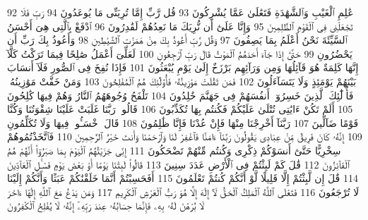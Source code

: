 {\tiny\colorbox{cl_aya}{92}} عَٰلِمِ ٱلْغَيْبِ وَٱلشَّهَٰدَةِ فَتَعَٰلَىٰ عَمَّا يُشْرِكُونَ
{\tiny\colorbox{cl_aya}{93}} قُل رَّبِّ إِمَّا تُرِيَنِّى مَا يُوعَدُونَ
{\tiny\colorbox{cl_aya}{94}} رَبِّ فَلَا تَجْعَلْنِى فِى ٱلْقَوْمِ ٱلظَّٰلِمِينَ
{\tiny\colorbox{cl_aya}{95}} وَإِنَّا عَلَىٰٓ أَن نُّرِيَكَ مَا نَعِدُهُمْ لَقَٰدِرُونَ
{\tiny\colorbox{cl_aya}{96}} ٱدْفَعْ بِٱلَّتِى هِىَ أَحْسَنُ ٱلسَّيِّئَةَ نَحْنُ أَعْلَمُ بِمَا يَصِفُونَ
{\tiny\colorbox{cl_aya}{97}} وَقُل رَّبِّ أَعُوذُ بِكَ مِنْ هَمَزَٰتِ ٱلشَّيَٰطِينِ
{\tiny\colorbox{cl_aya}{98}} وَأَعُوذُ بِكَ رَبِّ أَن يَحْضُرُونِ
{\tiny\colorbox{cl_aya}{99}} حَتَّىٰٓ إِذَا جَآءَ أَحَدَهُمُ ٱلْمَوْتُ قَالَ رَبِّ ٱرْجِعُونِ
{\tiny\colorbox{cl_aya}{100}} لَعَلِّىٓ أَعْمَلُ صَٰلِحًا فِيمَا تَرَكْتُ كَلَّآ إِنَّهَا كَلِمَةٌ هُوَ قَآئِلُهَا وَمِن وَرَآئِهِم بَرْزَخٌ إِلَىٰ يَوْمِ يُبْعَثُونَ
{\tiny\colorbox{cl_aya}{101}} فَإِذَا نُفِخَ فِى ٱلصُّورِ فَلَآ أَنسَابَ بَيْنَهُمْ يَوْمَئِذٍ وَلَا يَتَسَآءَلُونَ
{\tiny\colorbox{cl_aya}{102}} فَمَن ثَقُلَتْ مَوَٰزِينُهُۥ فَأُو۟لَٰٓئِكَ هُمُ ٱلْمُفْلِحُونَ
{\tiny\colorbox{cl_aya}{103}} وَمَنْ خَفَّتْ مَوَٰزِينُهُۥ فَأُو۟لَٰٓئِكَ ٱلَّذِينَ خَسِرُوٓا۟ أَنفُسَهُمْ فِى جَهَنَّمَ خَٰلِدُونَ
{\tiny\colorbox{cl_aya}{104}} تَلْفَحُ وُجُوهَهُمُ ٱلنَّارُ وَهُمْ فِيهَا كَٰلِحُونَ
{\tiny\colorbox{cl_aya}{105}} أَلَمْ تَكُنْ ءَايَٰتِى تُتْلَىٰ عَلَيْكُمْ فَكُنتُم بِهَا تُكَذِّبُونَ
{\tiny\colorbox{cl_aya}{106}} قَالُوا۟ رَبَّنَا غَلَبَتْ عَلَيْنَا شِقْوَتُنَا وَكُنَّا قَوْمًا ضَآلِّينَ
{\tiny\colorbox{cl_aya}{107}} رَبَّنَآ أَخْرِجْنَا مِنْهَا فَإِنْ عُدْنَا فَإِنَّا ظَٰلِمُونَ
{\tiny\colorbox{cl_aya}{108}} قَالَ ٱخْسَـُٔوا۟ فِيهَا وَلَا تُكَلِّمُونِ
{\tiny\colorbox{cl_aya}{109}} إِنَّهُۥ كَانَ فَرِيقٌ مِّنْ عِبَادِى يَقُولُونَ رَبَّنَآ ءَامَنَّا فَٱغْفِرْ لَنَا وَٱرْحَمْنَا وَأَنتَ خَيْرُ ٱلرَّٰحِمِينَ
{\tiny\colorbox{cl_aya}{110}} فَٱتَّخَذْتُمُوهُمْ سِخْرِيًّا حَتَّىٰٓ أَنسَوْكُمْ ذِكْرِى وَكُنتُم مِّنْهُمْ تَضْحَكُونَ
{\tiny\colorbox{cl_aya}{111}} إِنِّى جَزَيْتُهُمُ ٱلْيَوْمَ بِمَا صَبَرُوٓا۟ أَنَّهُمْ هُمُ ٱلْفَآئِزُونَ
{\tiny\colorbox{cl_aya}{112}} قَٰلَ كَمْ لَبِثْتُمْ فِى ٱلْأَرْضِ عَدَدَ سِنِينَ
{\tiny\colorbox{cl_aya}{113}} قَالُوا۟ لَبِثْنَا يَوْمًا أَوْ بَعْضَ يَوْمٍ فَسْـَٔلِ ٱلْعَآدِّينَ
{\tiny\colorbox{cl_aya}{114}} قَٰلَ إِن لَّبِثْتُمْ إِلَّا قَلِيلًا لَّوْ أَنَّكُمْ كُنتُمْ تَعْلَمُونَ
{\tiny\colorbox{cl_aya}{115}} أَفَحَسِبْتُمْ أَنَّمَا خَلَقْنَٰكُمْ عَبَثًا وَأَنَّكُمْ إِلَيْنَا لَا تُرْجَعُونَ
{\tiny\colorbox{cl_aya}{116}} فَتَعَٰلَى ٱللَّهُ ٱلْمَلِكُ ٱلْحَقُّ لَآ إِلَٰهَ إِلَّا هُوَ رَبُّ ٱلْعَرْشِ ٱلْكَرِيمِ
{\tiny\colorbox{cl_aya}{117}} وَمَن يَدْعُ مَعَ ٱللَّهِ إِلَٰهًا ءَاخَرَ لَا بُرْهَٰنَ لَهُۥ بِهِۦ فَإِنَّمَا حِسَابُهُۥ عِندَ رَبِّهِۦٓ إِنَّهُۥ لَا يُفْلِحُ ٱلْكَٰفِرُونَ
